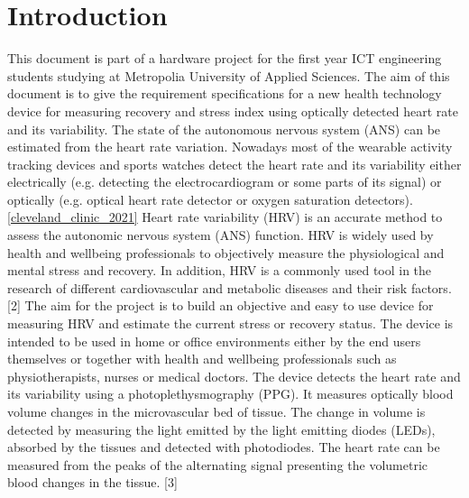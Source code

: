 \documentclass{article}
\begin{document}
\section{Introduction}
This document is part of a hardware project for the first year ICT engineering students
studying at Metropolia University of Applied Sciences. The aim of this document is to give
the requirement specifications for a new health technology device for measuring recovery
and stress index using optically detected heart rate and its variability.
The state of the autonomous nervous system (ANS) can be estimated from the heart rate
variation. Nowadays most of the wearable activity tracking devices and sports watches
detect the heart rate and its variability either electrically (e.g. detecting the electrocardiogram
or some parts of its signal) or optically (e.g. optical heart rate detector or oxygen saturation
detectors). \ref{cleveland_clinic_2021}
Heart rate variability (HRV) is an accurate method to assess the autonomic nervous system
(ANS) function. HRV is widely used by health and wellbeing professionals to objectively
measure the physiological and mental stress and recovery. In addition, HRV is a commonly
used tool in the research of different cardiovascular and metabolic diseases and their risk
factors. [2]
The aim for the project is to build an objective and easy to use device for measuring HRV
and estimate the current stress or recovery status. The device is intended to be used in
home or office environments either by the end users themselves or together with health and
wellbeing professionals such as physiotherapists, nurses or medical doctors.
The device detects the heart rate and its variability using a photoplethysmography (PPG). It
measures optically blood volume changes in the microvascular bed of tissue. The change in
volume is detected by measuring the light emitted by the light emitting diodes (LEDs),
absorbed by the tissues and detected with photodiodes. The heart rate can be measured
from the peaks of the alternating signal presenting the volumetric blood changes in the
tissue. [3]

\pagebreak
\end{document}
